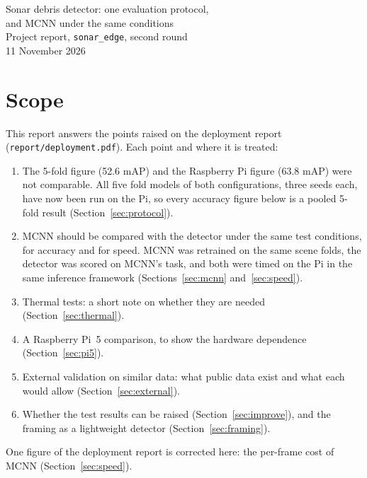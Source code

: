 \documentclass[11pt,a4paper]{article}
\begin{document}
\begin{center}
  {\LARGE Sonar debris detector: one evaluation protocol,\\[0.2em]
  and MCNN under the same conditions}\\[0.6em]
  {\large Project report, \texttt{sonar\_edge}, second round}\\[0.3em]
  11 November 2026
\end{center}
\vspace{0.5em}

\section*{Scope}

This report answers the points raised on the deployment report
(\texttt{report/deployment.pdf}). Each point and where it is treated:

\begin{enumerate}
  \item The 5-fold figure (52.6 mAP) and the Raspberry Pi figure (63.8 mAP)
        were not comparable. All five fold models of both configurations,
        three seeds each, have now been run on the Pi, so every accuracy
        figure below is a pooled 5-fold result
        (Section~\ref{sec:protocol}).
  \item MCNN should be compared with the detector under the same test
        conditions, for accuracy and for speed. MCNN was retrained on the same
        scene folds, the detector was scored on MCNN's task, and both were
        timed on the Pi in the same inference framework
        (Sections~\ref{sec:mcnn} and~\ref{sec:speed}).
  \item Thermal tests: a short note on whether they are needed
        (Section~\ref{sec:thermal}).
  \item A Raspberry Pi~5 comparison, to show the hardware dependence
        (Section~\ref{sec:pi5}).
  \item External validation on similar data: what public data exist and
        what each would allow (Section~\ref{sec:external}).
  \item Whether the test results can be raised (Section~\ref{sec:improve}),
        and the framing as a lightweight detector
        (Section~\ref{sec:framing}).
\end{enumerate}

One figure of the deployment report is corrected here: the per-frame cost
of MCNN (Section~\ref{sec:speed}).
\end{document}
